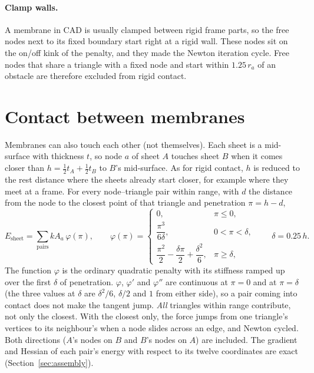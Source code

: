 \documentclass[11pt,a4paper]{article}
\theoremstyle{remark}
\begin{document}
\paragraph{Clamp walls.} A membrane in CAD is usually clamped between rigid frame parts, so the
free nodes next to its fixed boundary start right at a rigid wall. These nodes sit on the on/off
kink of the penalty, and they made the Newton iteration cycle. Free nodes that share a triangle
with a fixed node and start within $1.25\,r_a$ of an obstacle are therefore excluded from rigid
contact.

\section{Contact between membranes}\label{sec:sheet}

Membranes can also touch each other (not themselves). Each sheet is a mid-surface with thickness
$t$, so node $a$ of sheet $A$ touches sheet $B$ when it comes closer than
$h = \tfrac12 t_A + \tfrac12 t_B$ to $B$'s mid-surface. As for rigid contact, $h$ is reduced to the
rest distance where the sheets already start closer, for example where they meet at a frame. For
every node--triangle pair within range, with $d$ the distance from the node to the closest point
of that triangle and penetration $\pi = h-d$,
\begin{equation}
E_{\text{sheet}} = \sum_{\text{pairs}} k A_a\,\varphi(\pi),\qquad
\varphi(\pi) = \begin{cases}
0, & \pi\le 0,\\
\dfrac{\pi^3}{6\delta}, & 0<\pi<\delta,\\[6pt]
\dfrac{\pi^2}{2} - \dfrac{\delta\pi}{2} + \dfrac{\delta^2}{6}, & \pi\ge\delta,
\end{cases}
\qquad \delta = 0.25\,h.
\end{equation}
The function $\varphi$ is the ordinary quadratic penalty with its stiffness ramped up over the
first $\delta$ of penetration. $\varphi$, $\varphi'$ and $\varphi''$ are continuous at $\pi=0$ and
at $\pi=\delta$ (the three values at $\delta$ are $\delta^2/6$, $\delta/2$ and $1$ from either
side), so a pair coming into contact does not make the tangent jump. \emph{All} triangles within
range contribute, not only the closest. With the closest only, the force jumps from one
triangle's vertices to its neighbour's when a node slides across an edge, and Newton cycled. Both
directions ($A$'s nodes on $B$ and $B$'s nodes on $A$) are included. The gradient and Hessian of
each pair's energy with respect to its twelve coordinates are exact
(Section~\ref{sec:assembly}).
\end{document}
